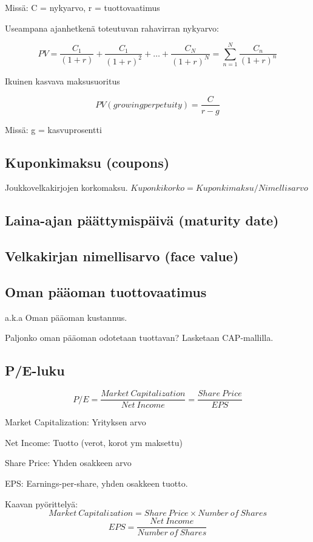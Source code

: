 \documentclass[a4paper]{article}
\begin{document}
Missä: C = nykyarvo, r = tuottovaatimus

Useampana ajanhetkenä toteutuvan rahavirran nykyarvo:

\[
PV = \frac{C_1}{(1 + r)} + \frac{C_1}{(1 + r)^2} + \dots + \frac{C_N}{(1 + r)^N} = \sum_{n=1}^{N} \frac{C_n}{(1 + r)^n}
\]

Ikuinen kasvava maksusuoritus

\[
PV (growing perpetuity) = \frac{C}{r - g}
\]

Missä: g = kasvuprosentti

\subsection{Kuponkimaksu (coupons)}

Joukkovelkakirjojen korkomaksu. $Kuponkikorko = Kuponkimaksu / Nimellisarvo$

\subsection{Laina-ajan päättymispäivä (maturity date)}

\subsection{Velkakirjan nimellisarvo (face value)}

\subsection{Oman pääoman tuottovaatimus}

a.k.a Oman pääoman kustannus.

Paljonko oman pääoman odotetaan tuottavan? Lasketaan CAP-mallilla.

\subsection{P/E-luku}

\[
    P/E = \frac{Market\ Capitalization}{Net\ Income} = \frac{Share\ Price}{EPS}
\]

Market Capitalization: Yrityksen arvo

Net Income: Tuotto (verot, korot ym maksettu)

Share Price: Yhden osakkeen arvo

EPS: Earnings-per-share, yhden osakkeen tuotto.

Kaavan pyörittelyä: 
\[
    Market\ Capitalization = Share\ Price \times Number\ of\ Shares
\]
\[
    EPS = \frac{Net\ Income}{Number\ of\ Shares} 
\]
\end{document}

